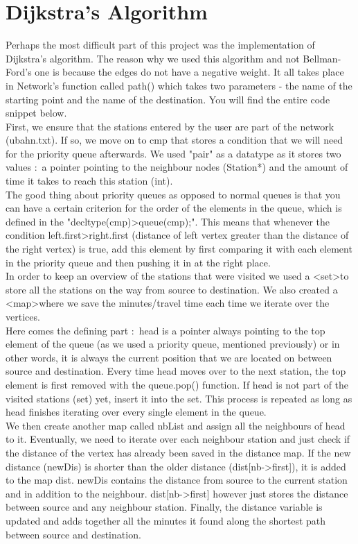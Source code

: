 \documentclass[12pt]{article}
\begin{document}
\section{Dijkstra's Algorithm}
Perhaps the most difficult part of this project was the implementation of Dijkstra's algorithm. The reason why we used this algorithm and not Bellman-Ford's one is because the edges do not have a negative weight. It all takes place in Network's function called path() which takes two parameters - the name of the starting point and the name of the destination. You will find the entire code snippet below.\\
First, we ensure that the stations entered by the user are part of the network (ubahn.txt). If so, we move on to cmp that stores a condition that we will need for the priority queue afterwards. We used "pair" as a datatype as it stores two values $\colon$ a pointer pointing to the neighbour nodes (Station*) and the amount of time it takes to reach this station (int).\\
The good thing about priority queues as opposed to normal queues is that you can have a certain criterion for the order of the elements in the queue, which is defined in the "decltype(cmp)\textgreater queue(cmp);". This means that whenever the condition left.first\textgreater right.first (distance of left vertex greater than the distance of the right vertex) is true, add this element by first comparing it with each element in the priority queue and then pushing it in at the right place.\\
In order to keep an overview of the stations that were visited we used a \textless set\textgreater to store all the stations on the way from source to destination. We also created a \textless map\textgreater where we save the minutes/travel time each time we iterate over the vertices.\\
Here comes the defining part $\colon$ head is a pointer always pointing to the top element of the queue (as we used a priority queue, mentioned previously) or in other words, it is always the current position that we are located on between source and destination. Every time head moves over to the next station, the top element is first removed with the queue.pop() function. If head is not part of the visited stations (set) yet, insert it into the set. This process is repeated as long as head finishes iterating over every single element in the queue.\\ 
We then create another map called nbList and assign all the neighbours of head to it. Eventually, we need to iterate over each neighbour station and just check if the distance of the vertex has already been saved in the distance map. If the new distance (newDis) is shorter than the older distance (dist[nb-\textgreater first]), it is added to the map dist. newDis contains the distance from source to the current station and in addition to the neighbour. dist[nb-\textgreater first] however just stores the distance between source and any neighbour station. Finally, the distance variable is updated and adds together all the minutes it found along the shortest path between source and destination.\\
\end{document}
